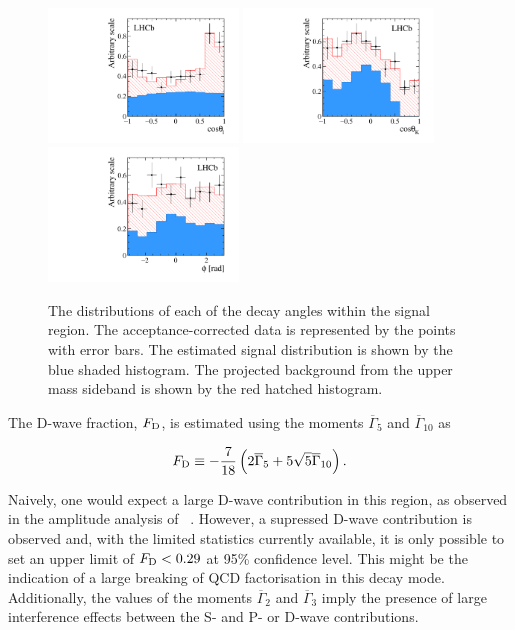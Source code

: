 \begin{figure}[!tb]
  \centering
  \includegraphics[width=0.45\textwidth]{figs/kpimm/angular-analysis/costhetal.pdf}
  \includegraphics[width=0.45\textwidth]{figs/kpimm/angular-analysis/costhetak.pdf}\\
  \includegraphics[width=0.45\textwidth]{figs/kpimm/angular-analysis/phi.pdf}
  \caption{The distributions of each of the decay angles within the signal region. The acceptance-corrected data is represented by the points with error bars. The estimated signal distribution is shown by the blue shaded histogram. The projected background from the upper mass sideband is shown by the red hatched histogram.}
  \label{fig:gof_spd}
\end{figure}

The D-wave fraction, $F_{\rm D}$, is estimated using the moments $\overline{\Gamma}_{5}$ and $\overline{\Gamma}_{10}$ as 

\begin{equation}
F_{\rm D} \equiv  \displaystyle - \frac{7}{18} \left(2 \overline{\Gamma}_{5} + 5 \sqrt{5} \overline{\Gamma}_{10} \right).
\end{equation}

\noindent
Naively, one would expect a large D-wave contribution in this region, as observed in the amplitude analysis of \BdToJPsiKpi~\cite{belle-z-paper}. However, a supressed D-wave contribution is observed and, with the limited statistics currently available, it is only possible to set an upper limit of $F_{\rm D}<0.29$ at 95\% confidence level. This might be the indication of a large breaking of QCD factorisation in this decay mode.  Additionally, the values of the moments $\overline{\Gamma}_{2}$ and $\overline{\Gamma}_{3}$ imply the presence of large interference effects between the S- and P- or D-wave contributions.